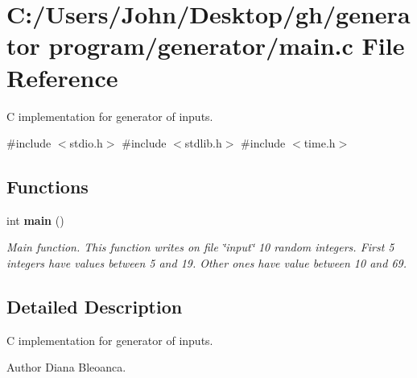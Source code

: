 \section{C\+:/\+Users/\+John/\+Desktop/gh/generator program/generator/main.c File Reference}
\label{main_8c}


C implementation for generator of inputs.  


{\ttfamily \#include $<$stdio.\+h$>$}\newline
{\ttfamily \#include $<$stdlib.\+h$>$}\newline
{\ttfamily \#include $<$time.\+h$>$}\newline
\subsection*{Functions}
\begin{DoxyCompactItemize}
\item 
\mbox{\label{main_8c_ae66f6b31b5ad750f1fe042a706a4e3d4}} 
int \textbf{ main} ()
\begin{DoxyCompactList}\small\item\em Main function. This function writes on file \char`\"{}input\char`\"{} 10 random integers. First 5 integers have values between 5 and 19. Other ones have value between 10 and 69. \end{DoxyCompactList}\end{DoxyCompactItemize}


\subsection{Detailed Description}
C implementation for generator of inputs. 

\begin{DoxyAuthor}{Author}
Diana Bleoanca. 
\end{DoxyAuthor}
